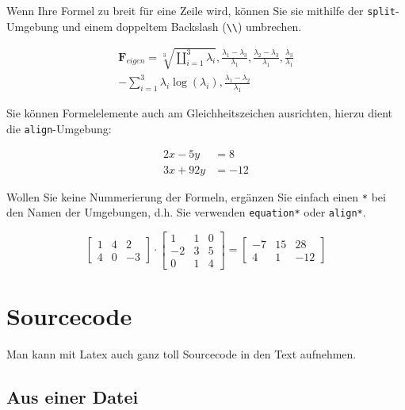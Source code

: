 Wenn Ihre Formel zu breit für eine Zeile wird, können Sie sie mithilfe der \texttt{split}-Umgebung und einem doppeltem Backslash (\verb+\\+) umbrechen.

\begin{equation}
\label{eq:4}
\begin{split}
\mathbf{F}_{{eigen}}=\sqrt[3]{\coprod_{i=1}^{3} \lambda_{i}},
\frac{\lambda_{1}-\lambda_{3}}{\lambda_{1}},
\frac{\lambda_{2}-\lambda_{3}}{\lambda_{1}},
\frac{\lambda_{3}}{\lambda_{1}} \\-
\sum_{i=1}^{3} \lambda_{i} \log \left(\lambda_{i}\right),
\frac{\lambda_{1}-\lambda_{2}}{\lambda_{1}}
\end{split}
\end{equation}

Sie können Formelelemente auch am Gleichheitszeichen ausrichten, hierzu dient die \texttt{align}-Umgebung:

\begin{align}
2x - 5y &=  8 \\
3x + 92y &=  -12
\end{align}

Wollen Sie keine Nummerierung der Formeln, ergänzen Sie einfach einen \texttt{*} bei den Namen der Umgebungen, d.h. Sie verwenden \texttt{equation*} oder \texttt{align*}.

\begin{equation*}
\begin{bmatrix}
   1 &  4 &  2 \\
   4 &  0 & -3
\end{bmatrix}
        \cdot
\begin{bmatrix}
   1 &  1 &  0 \\
  -2 &  3 &  5 \\
   0 &  1 &  4
\end{bmatrix}
       {=}
\begin{bmatrix}
  -7 &  15 &  28 \\
   4 &   1 & -12
\end{bmatrix}
\end{equation*}


\section{Sourcecode}

Man kann mit Latex auch ganz toll Sourcecode in den Text aufnehmen.

\subsection{Aus einer Datei}

